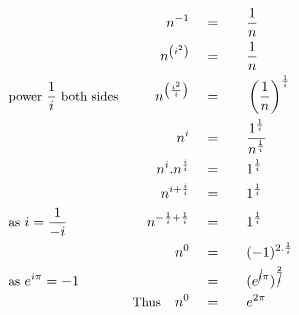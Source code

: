 \begin{alignat*}{5}
&\,&n^{-1}\quad&=\quad&&\frac{1}{n}\\
&\,&n^{\left(i^2\right)}\quad&=&&\frac{1}{n}\\
&\small\text{power }\frac{1}{i}\text{ both sides}&n^{\left(\frac{i^2}{i}\right)}\quad&=&&\left(\frac{1}{n}\right)^\frac{1}{i}\\
&\,&n^i\quad&=&&\frac{1^\frac{1}{i}}{n^\frac{1}{i}}\\
&\,&n^i.n^\frac{i}{i}\quad&=&&1^\frac{1}{i}\\
&\,&n^{i+\frac{i}{i}}\quad&=&&1^\frac{1}{i}\\
&\small\text{as }i=\frac{1}{-i}&n^{-\frac{1}{i}+\frac{1}{i}}\quad&=&&1^\frac{1}{i}\\
&\,&n^0\quad&=&&(-1)^{2.\frac{1}{i}}\\
&\small\text{as }e^{i\pi}=-1&\,&=&&(e^{\cancel{i}\pi})^\frac{2}{\cancel{i}}\\
&\,&\small\text{Thus}\normalsize\quad n^0\quad&=&&e^{2\pi}\\
\end{alignat*}
